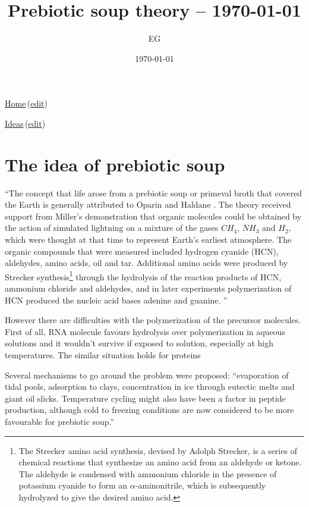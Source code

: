 \documentclass[12pt]{paper}
\title{Prebiotic soup theory -- \today}
\author{EG}
\date{\today}
\newcommand{\ga}{\alpha}
\newcommand{\wikilink}[2] { \href{#1.pdf}{#2}\,(\href{#1.tex}{edit})}
\begin{document}
 \maketitle
\wikilink{home}{Home}

\wikilink{ideas}{Ideas}

\section{The idea of prebiotic soup}
``The concept that life arose from a prebiotic soup or primeval broth that covered the Earth is 
generally attributed to Oparin \cite{Oparin1952} and Haldane \cite{Haldane1929}. The theory 
received support from Miller’s \cite{Miller1953} demonstration that organic molecules could be
obtained by the action of simulated lightning on a mixture of the gases $CH_4$, $NH_3$ and $H_2$, 
which were thought at that time to represent Earth’s earliest atmosphere. The organic compounds 
that were measured included hydrogen cyanide (HCN), aldehydes, amino acids, oil and tar. Additional 
amino acids were produced by Strecker synthesis\footnote{The Strecker amino acid synthesis, devised 
by Adolph Strecker, is a series of chemical reactions that synthesize an amino acid from an 
aldehyde or ketone. The aldehyde is condensed with ammonium chloride in the presence of 
potassium cyanide to form an $\ga$-aminonitrile, which is subsequently hydrolyzed to give the 
desired amino acid.}
 through the hydrolysis of the reaction products of 
HCN, ammonium chloride and aldehydes, and in later experiments polymerization of HCN
produced the nucleic acid bases adenine and guanine. ''\cite{Martin2008}

However there are difficulties with the polymerization of the precursor molecules. First of all, 
RNA molecule favours hydrolysis over polymerization in aqueous solutions and it wouldn't survive 
if exposed to solution, especially at high temperatures\cite{Pace1991}. The similar situation 
holds for proteins \cite{Lambert2008}

Several mechanisms to go around the problem were proposed: ``evaporation of tidal pools, 
adsorption to clays, concentration in ice through eutectic melts and giant oil
slicks. Temperature cycling might also have been a factor in peptide production, although cold to 
freezing conditions are now considered to be more favourable for prebiotic 
soup\cite{Bada2004}.''\cite{Martin2008}





  
\end{document}

